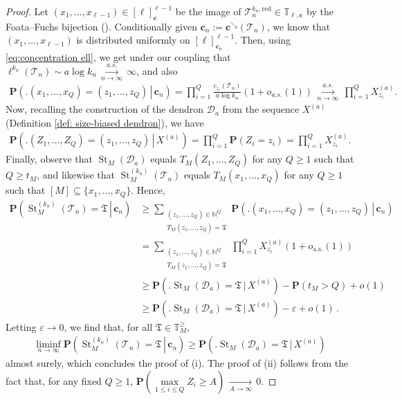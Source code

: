 \documentclass{article}
\theoremstyle{remark}
\newcommand{\bN}{\mathbb{N}}
\newcommand{\bT}{\mathbb{T}}
\newcommand{\cv}[1]{\,\underset{#1}{\longrightarrow}\,}
\newcommand{\cT}{\mathcal{T}}
\newcommand{\cD}{\mathcal{D}}
\newcommand{\fT}{\mathfrak{T}}
\newcommand{\bc}{\mathbf{c}}
\newcommand{\prob}[1]{\mathbf{P}{\left(#1\right)}}
\newcommand{\probcond}[2]{\mathbf{P}{\left(\left. #1 \,\right|\, #2 \right)}}
\newcommand{\red}{\mathrm{red}}
\DeclareMathOperator{\St}{St}
\begin{document}
\begin{proof}
Let $(x_1,\ldots,x_{\ell-1}) \in [\ell]^{\ell-1}_\bc$ be the image of $\cT_n^{k_n,\red} \in \bT_{\ell,\bc}$ by the Foata--Fuchs bijection ().
Conditionally given $\bc_n := \bc^\searrow(\cT_n)$, we know that $(x_1,\ldots,x_{\ell-1})$ is distributed uniformly on $[\ell]^{\ell-1}_{\bc_n}$.
Then, using \eqref{eq:concentration ell}, we get under our coupling that $\ell^{k_n}(\cT_n) \sim a\log k_n \overset{a.s.}{\cv{n\to\infty}} \infty$, and also
\begin{align*}
    \probcond{\big. (x_1,\ldots,x_Q)=(z_1,\ldots,z_Q)}{\bc_n} = \prod_{i=1}^Q \frac{c_{z_i}(\cT_n)}{a \log k_n} (1+o_{a.s.}(1))
    \overset{a.s.}{\cv{n\to\infty}} \prod_{i=1}^Q X^{(a)}_{z_i}.
\end{align*}
Now, recalling the construction of the dendron $\cD_a$ from the sequence $X^{(a)}$ (Definition \ref{def: size-biased dendron}), we have
\begin{align*}
    \probcond{\Big. (Z_1,\ldots,Z_Q)=(z_1,\ldots,z_Q) }{X^{(a)}} =\prod_{i=1}^Q \prob{Z_i=z_i}
    = \prod_{i=1}^{Q} X^{(a)}_{z_i}.
\end{align*}
Finally, observe that $\St_M(\cD_a)$ equals $T_M(Z_1, \dots, Z_Q)$ for any $Q\ge1$ such that $Q \ge t_M$,
and likewise that $\St_M^{(k_n)}(\cT_n)$ equals $T_M(x_1, \dots, x_Q)$ for any $Q\ge1$ such that $[M] \subseteq \{ x_1, \dots, x_Q \}$.
Hence,
\begin{align*}
\probcond{\St_M^{(k_n)}(\cT_n)=\fT}{\bc_n} 
&\geq \sum\limits_{\substack{(z_1,\ldots,z_Q) \in \bN^Q \\ T_M(z_1,\ldots,z_Q)=\fT}} \probcond{\big. (x_1,\ldots,x_Q)=(z_1,\ldots,z_Q)}{\bc_n} \\
&= \sum\limits_{\substack{(z_1,\ldots,z_Q) \in\bN^Q \\ T_M(z_1,\ldots,z_Q)=\fT}}\prod_{i=1}^Q X_{z_i}^{(a)} (1+o_{\text{a.s.}}(1))\\
& \geq \probcond{\big. \St_M(\cD_a)=\fT }{X^{(a)}} - \prob{t_M > Q} + o(1)\\
& \geq \probcond{\big. \St_M(\cD_a)=\fT }{X^{(a)}} -\varepsilon + o(1) \,.
\end{align*}
Letting $\varepsilon \rightarrow 0$, we find that, for all $\fT \in \bT^{\geq}_M$,
\begin{align*}
\liminf_{n \rightarrow \infty} \probcond{ \St_M^{(k_n)}(\cT_n)=\fT }{\bc_n} \geq \probcond{\Big. \St_M(\cD_a)=\fT }{X^{(a)}}
\end{align*}
almost surely, which concludes the proof of (i).
The proof of (ii) follows from the fact that, for any fixed $Q \geq 1$, $\prob{\max\limits_{1 \leq i \leq Q} Z_i \geq A} \cv{A\to\infty} 0$.
\end{proof}
\end{document}
